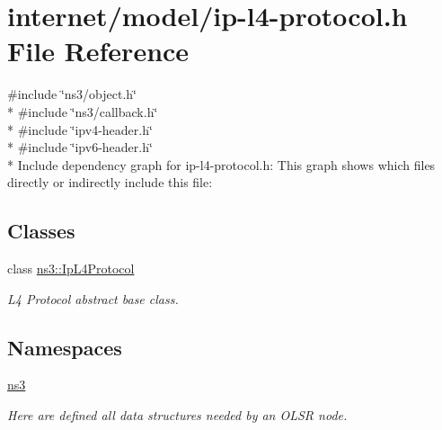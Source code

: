 \hypertarget{ip-l4-protocol_8h}{}\section{internet/model/ip-\/l4-\/protocol.h File Reference}
\label{ip-l4-protocol_8h}
{\ttfamily \#include \char`\"{}ns3/object.\+h\char`\"{}}\\*
{\ttfamily \#include \char`\"{}ns3/callback.\+h\char`\"{}}\\*
{\ttfamily \#include \char`\"{}ipv4-\/header.\+h\char`\"{}}\\*
{\ttfamily \#include \char`\"{}ipv6-\/header.\+h\char`\"{}}\\*
Include dependency graph for ip-\/l4-\/protocol.h\+:
This graph shows which files directly or indirectly include this file\+:
\subsection*{Classes}
\begin{DoxyCompactItemize}
\item 
class \hyperlink{classns3_1_1IpL4Protocol}{ns3\+::\+Ip\+L4\+Protocol}
\begin{DoxyCompactList}\small\item\em L4 Protocol abstract base class. \end{DoxyCompactList}\end{DoxyCompactItemize}
\subsection*{Namespaces}
\begin{DoxyCompactItemize}
\item 
 \hyperlink{namespacens3}{ns3}
\begin{DoxyCompactList}\small\item\em Here are defined all data structures needed by an O\+L\+SR node. \end{DoxyCompactList}\end{DoxyCompactItemize}
